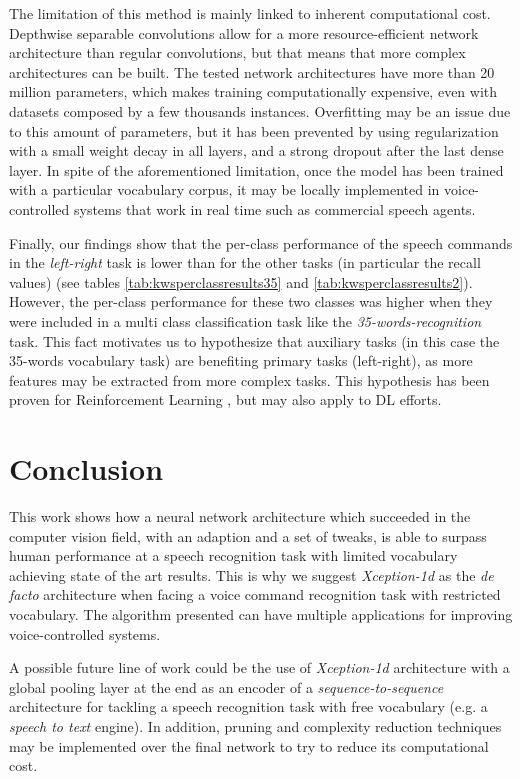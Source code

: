 The limitation of this method is mainly linked to inherent computational cost. Depthwise separable convolutions allow for a more resource-efficient network architecture than regular convolutions, but that means that more complex architectures can be built. The tested network architectures have more than 20 million parameters, which makes training computationally expensive, even with datasets composed by a few thousands instances. Overfitting may be an issue due to this amount of parameters, but it has been prevented by using regularization with a small weight decay in all layers, and a strong dropout after the last dense layer. In spite of the aforementioned limitation, once the model has been trained with a particular vocabulary corpus, it may be locally implemented in voice-controlled systems that work in real time such as commercial speech agents.


Finally, our findings show that the per-class performance of the speech commands in the \textit{left-right} task is lower than for the other tasks (in particular the recall values) (see tables \ref{tab:kwsperclassresults35} and \ref{tab:kwsperclassresults2}). However, the per-class performance for these two classes was higher when they were included in a multi class classification task like the \textit{35-words-recognition} task. This fact motivates us to hypothesize that auxiliary tasks (in this case the 35-words vocabulary task) are benefiting primary tasks (left-right), as more features may be extracted from more complex tasks. This hypothesis has been proven for Reinforcement Learning \autocite{Jaderberg2016}, but may also apply to DL efforts.




\section{Conclusion} \label{sec:conclusion}
This work shows how a neural network architecture which succeeded in the computer vision field, with an adaption and a set of tweaks, is able to surpass human performance at a speech recognition task with limited vocabulary achieving state of the art results. This is why we suggest \textit{Xception-1d} as the \textit{de facto} architecture when facing a voice command recognition task with restricted vocabulary. The algorithm presented can have multiple  applications for improving voice-controlled systems.

A possible future line of work could be  the use of \textit{Xception-1d} architecture with a global pooling layer at the end  as an encoder of a \textit{sequence-to-sequence} architecture for tackling a speech recognition task with free vocabulary (e.g. a \textit{speech to text} engine). In addition, pruning and complexity reduction techniques may be implemented over the final network to try to reduce its computational cost.


